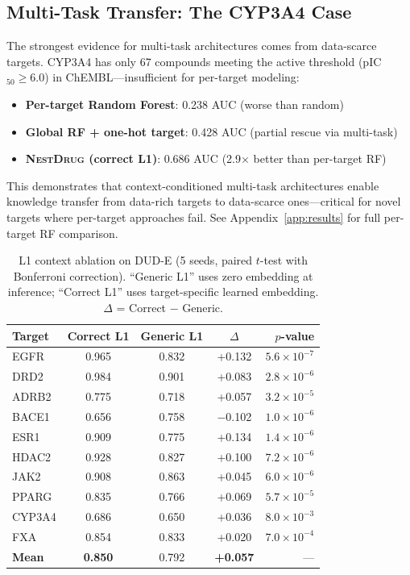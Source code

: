\documentclass[sigconf,anonymous]{acmart}
\newcommand{\methodname}{\textsc{NestDrug}}
\begin{document}
\subsection{Multi-Task Transfer: The CYP3A4 Case}

The strongest evidence for multi-task architectures comes from data-scarce targets. CYP3A4 has only 67 compounds meeting the active threshold (pIC$_{50} \geq 6.0$) in ChEMBL---insufficient for per-target modeling:
\begin{itemize}[noitemsep,topsep=0pt]
    \item \textbf{Per-target Random Forest}: 0.238 AUC (worse than random)
    \item \textbf{Global RF + one-hot target}: 0.428 AUC (partial rescue via multi-task)
    \item \textbf{\methodname{} (correct L1)}: 0.686 AUC (2.9$\times$ better than per-target RF)
\end{itemize}
This demonstrates that context-conditioned multi-task architectures enable knowledge transfer from data-rich targets to data-scarce ones---critical for novel targets where per-target approaches fail. See Appendix~\ref{app:results} for full per-target RF comparison.

\begin{table}[t]
\caption{L1 context ablation on DUD-E (5 seeds, paired $t$-test with Bonferroni correction). ``Generic L1'' uses zero embedding at inference; ``Correct L1'' uses target-specific learned embedding. $\Delta$ = Correct $-$ Generic.}
\label{tab:l1_ablation}
\centering
\small
\begin{tabular}{@{}lcccr@{}}
\toprule
Target & Correct L1 & Generic L1 & $\Delta$ & $p$-value \\
\midrule
EGFR & 0.965 & 0.832 & +0.132 & $5.6 \times 10^{-7}$ \\
DRD2 & 0.984 & 0.901 & +0.083 & $2.8 \times 10^{-6}$ \\
ADRB2 & 0.775 & 0.718 & +0.057 & $3.2 \times 10^{-5}$ \\
BACE1 & 0.656 & 0.758 & $-$0.102 & $1.0 \times 10^{-6}$ \\
ESR1 & 0.909 & 0.775 & +0.134 & $1.4 \times 10^{-6}$ \\
HDAC2 & 0.928 & 0.827 & +0.100 & $7.2 \times 10^{-6}$ \\
JAK2 & 0.908 & 0.863 & +0.045 & $6.0 \times 10^{-6}$ \\
PPARG & 0.835 & 0.766 & +0.069 & $5.7 \times 10^{-5}$ \\
CYP3A4 & 0.686 & 0.650 & +0.036 & $8.0 \times 10^{-3}$ \\
FXA & 0.854 & 0.833 & +0.020 & $7.0 \times 10^{-4}$ \\
\midrule
\textbf{Mean} & \textbf{0.850} & 0.792 & \textbf{+0.057} & --- \\
\bottomrule
\end{tabular}
\end{table}
\end{document}
